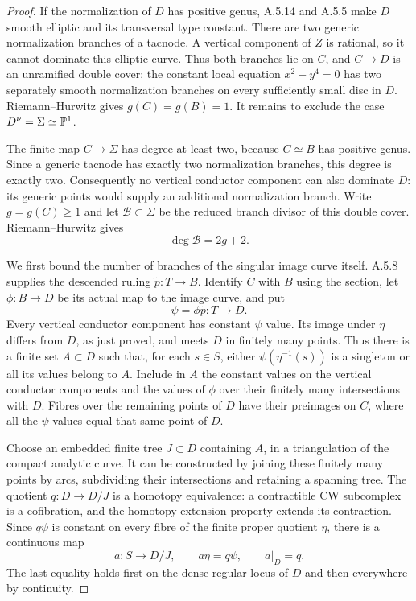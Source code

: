 \begin{proof}
If the normalization of $D$ has positive genus, A.5.14
and A.5.5 make $D$ smooth elliptic and its transversal
type constant. There are two generic normalization
branches of a tacnode. A vertical component of $Z$
is rational, so it cannot dominate this elliptic curve.
Thus both branches lie on $C$, and $C\to D$ is an
unramified double cover: the constant local equation
$x^2-y^4=0$ has two separately smooth normalization
branches on every sufficiently small disc in $D$.
Riemann--Hurwitz gives $g(C)=g(B)=1$.
It remains to exclude the case $D^\nu=\Sigma\simeq\mathbb P^1$.

The finite map $C\to\Sigma$ has degree at least two,
because $C\simeq B$ has positive genus. Since a generic
tacnode has exactly two normalization branches, this
degree is exactly two. Consequently no vertical
conductor component can also dominate $D$: its generic
points would supply an additional normalization branch.
Write $g=g(C)\ge1$ and let $\mathcal B\subset\Sigma$
be the reduced branch divisor of this double cover.
Riemann--Hurwitz gives
\[
                   \deg\mathcal B=2g+2.             \tag{A.T.1}
\]

We first bound the number of branches of the singular
image curve itself. A.5.8 supplies the descended ruling
$\widetilde p:T\to B$. Identify $C$ with $B$ using the
section, let $\phi:B\to D$ be its actual map to the
image curve, and put
\[
                    \psi=\phi\widetilde p:T\to D.
\]
Every vertical conductor component has constant $\psi$
value. Its image under $\eta$ differs from $D$, as just
proved, and meets $D$ in finitely many points. Thus
there is a finite set $A\subset D$ such that, for each
$s\in S$, either $\psi(\eta^{-1}(s))$ is a singleton
or all its values belong to $A$. Include in $A$ the
constant values on the vertical conductor components
and the values of $\phi$ over their finitely many
intersections with $D$. Fibres over the remaining
points of $D$ have their preimages on $C$, where all
the $\psi$ values equal that same point of $D$.

Choose an embedded finite tree $J\subset D$ containing
$A$, in a triangulation of the compact analytic curve.
It can be constructed by joining these finitely many
points by arcs, subdividing their intersections and
retaining a spanning tree. The quotient
$q:D\to D/J$ is a homotopy equivalence: a contractible
CW subcomplex is a cofibration, and the homotopy
extension property extends its contraction. Since
$q\psi$ is constant on every fibre of the finite
proper quotient $\eta$, there is a continuous map
\[
 a:S\to D/J,\qquad a\eta=q\psi,\qquad a|_D=q.     \tag{A.T.2}
\]
The last equality holds first on the dense regular
locus of $D$ and then everywhere by continuity.


\end{proof}
